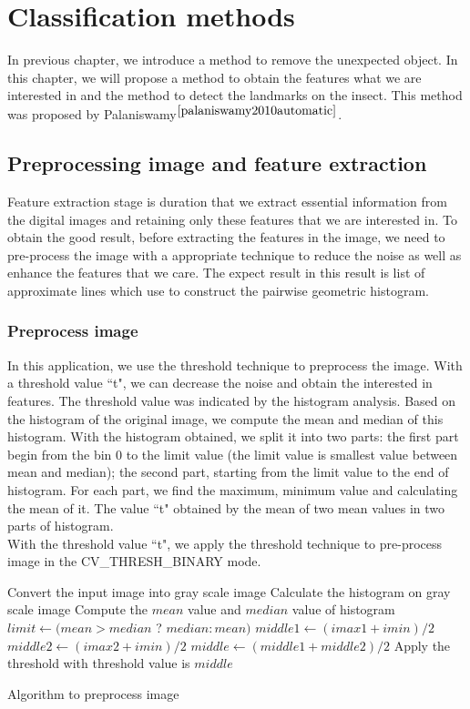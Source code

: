\chapter{Classification methods }
In previous chapter, we introduce a method to remove the unexpected object. In this chapter, we will propose a method to obtain the features what we are interested in and the method to detect the landmarks on the insect. This method was proposed by Palaniswamy$^{\cite{palaniswamy2010automatic}}$.
\section{Preprocessing image and feature extraction}
Feature extraction stage is duration that we extract essential information from the digital images and retaining only these features that we are interested in. To obtain the good result, before extracting the features in the image, we need to pre-process the image with a appropriate technique to reduce the noise as well as enhance the features that we care. The expect result in this result is list of approximate lines which use to construct the pairwise geometric histogram.
\subsection{Preprocess image}
In this application, we use the threshold technique to preprocess the image. With a threshold value ``t", we can decrease the noise and obtain the interested in features. The threshold value was indicated by the histogram analysis. Based on the histogram of the original image, we compute the mean and median of this histogram. With the histogram obtained, we split it into two parts: the first part begin from the bin 0 to the limit value (the limit value is smallest value between mean and median); the second part, starting from the limit value to the end of histogram. For each part, we find the maximum, minimum value and calculating the mean of it. The value ``t" obtained by the mean of two mean values in two parts of histogram.\\
With the threshold value ``t", we apply the threshold technique to pre-process image in the CV\_THRESH\_BINARY mode.\\
\IncMargin{1em}
\begin{algorithm}[H]
\Indm 
{}
\Indp
Convert the input image into gray scale image\;
Calculate the histogram on gray scale image\;
Compute the $mean$ value and $median$ value of histogram\;
$limit \leftarrow (mean > median$ ? $median : mean)$\;
$middle1 \leftarrow (imax1 + imin)/2$ \;
$middle2 \leftarrow (imax2 + imin)/2$ \;
$middle \leftarrow (middle1 + middle2)/2$ \;
Apply the threshold with threshold value is $middle$\;
\caption{Algorithm to preprocess image}
\end{algorithm}\DecMargin{1em}
